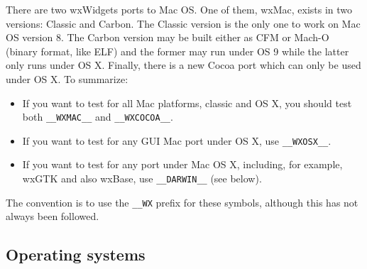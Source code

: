 There are two wxWidgets ports to Mac OS. One of them, wxMac, exists in two versions: Classic and
Carbon. The Classic version is the only one to work on Mac OS version 8. The
Carbon version may be built either as CFM or Mach-O (binary format, like ELF)
and the former may run under OS 9 while the latter only runs under OS X.
Finally, there is a new Cocoa port which can only be used under OS X. To
summarize:

\begin{itemize}
\item If you want to test for all Mac platforms, classic and OS X, you
should test both \texttt{\_\_WXMAC\_\_} and \texttt{\_\_WXCOCOA\_\_}.
\item If you want to test for any GUI Mac port under OS X, use 
\texttt{\_\_WXOSX\_\_}.
\item If you want to test for any port under Mac OS X, including, for
example, wxGTK and also wxBase, use \texttt{\_\_DARWIN\_\_} (see below).
\end{itemize}

The convention is to use the \texttt{\_\_WX} prefix for these
symbols, although this has not always been followed.

\subsection{Operating systems}\label{osconst}

\begin{twocollist}\itemsep=0pt
\end{twocollist}


